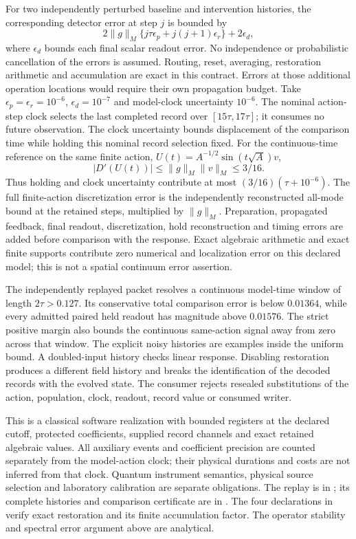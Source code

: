 For two independently perturbed baseline and intervention histories,
the corresponding detector error at step $j$ is bounded by
\[
 2\|g\|_M\{j\tau\epsilon_p+j(j+1)\epsilon_r\}
       +2\epsilon_d,
\]
where $\epsilon_d$ bounds each final scalar readout error.
No independence or probabilistic cancellation of the errors is assumed.
Routing, reset, averaging, restoration arithmetic and accumulation are
exact in this contract. Errors at those additional operation locations
would require their own propagation budget.
Take $\epsilon_p=\epsilon_r=10^{-6}$,
$\epsilon_d=10^{-7}$ and model-clock uncertainty $10^{-6}$.
The nominal action-step clock selects the last completed record over
$[15\tau,17\tau]$; it consumes no future observation.
The clock uncertainty bounds displacement of the comparison time while
holding this nominal record selection fixed.
For the continuous-time reference on the same finite action,
$U(t)=A^{-1/2}\sin(t\sqrt A)v$,
\[
 |D'(U(t))|\le\|g\|_M\|v\|_M\le3/16.
\]
Thus holding and clock uncertainty contribute at most
$(3/16)(\tau+10^{-6})$. The full finite-action discretization error
is the independently reconstructed all-mode bound at the retained
steps, multiplied by $\|g\|_M$. Preparation, propagated feedback,
final readout, discretization, hold reconstruction and timing errors
are added before comparison with the response. Exact algebraic
arithmetic and exact finite supports contribute zero numerical and
localization error on this declared model; this is not a spatial
continuum error assertion.

The independently replayed packet resolves a continuous model-time
window of length $2\tau>0.127$. Its conservative total comparison
error is below $0.01364$, while every admitted paired held readout
has magnitude above $0.01576$. The strict positive margin also bounds
the continuous same-action signal away from zero across that window.
The explicit noisy histories are examples inside the uniform bound.
A doubled-input history checks linear response. Disabling restoration
produces a different field history and breaks the identification of the
decoded records with the evolved state. The consumer rejects resealed
substitutions of the action, population, clock, readout, record value
or consumed writer.

This is a classical software realization with bounded registers at the
declared cutoff, protected coefficients, supplied record channels and
exact retained algebraic values. All auxiliary events and coefficient
precision are counted separately from the model-action clock; their
physical durations and costs are not inferred from that clock. Quantum
instrument semantics, physical source selection and laboratory
calibration are separate obligations. The replay is in
; its complete histories and
comparison certificate are in
.
The four declarations in
verify exact restoration and its finite accumulation factor. The
operator stability and spectral error argument above are analytical.
